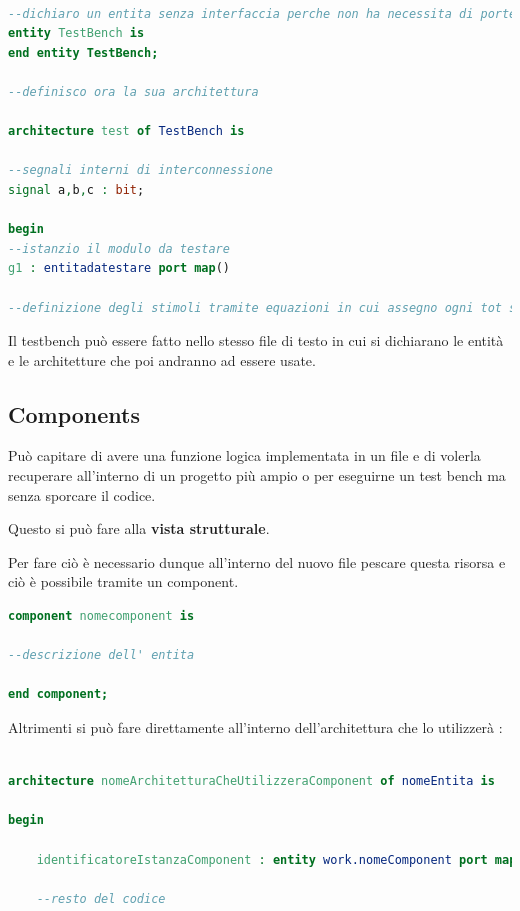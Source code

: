 \documentclass[a4paper]{book}
\begin{document}
\begin{lstlisting}[language=VHDL]

--dichiaro un entita senza interfaccia perche non ha necessita di porte di ingresso ne di uscita.
entity TestBench is 
end entity TestBench;

--definisco ora la sua architettura

architecture test of TestBench is 

--segnali interni di interconnessione
signal a,b,c : bit;

begin
--istanzio il modulo da testare
g1 : entitadatestare port map()

--definizione degli stimoli tramite equazioni in cui assegno ogni tot secondi un certo valore ai signal del mio testBench che a loro volta verranno assegnati alle porte dell entita da testare.

\end{lstlisting}

Il testbench può essere fatto nello stesso file di testo in cui si dichiarano le entità e le architetture che poi andranno ad essere usate.


\subsection{Components}

Può capitare di avere una funzione logica implementata in un file e di volerla recuperare all'interno di un progetto più ampio o per eseguirne un test bench ma senza sporcare il codice.

Questo si può fare alla  \textbf{vista strutturale}.

Per fare ciò è necessario dunque all'interno del nuovo file pescare questa risorsa e ciò è possibile tramite un component.


\begin{lstlisting}[language=VHDL]
component nomecomponent is 

--descrizione dell' entita

end component;
\end{lstlisting}

Altrimenti si può fare direttamente all'interno dell'architettura che lo utilizzerà :

\begin{lstlisting}[language=VHDL]

architecture nomeArchitetturaCheUtilizzeraComponent of nomeEntita is

begin

	identificatoreIstanzaComponent : entity work.nomeComponent port map ();
	
	--resto del codice


\end{lstlisting}
\end{document}

